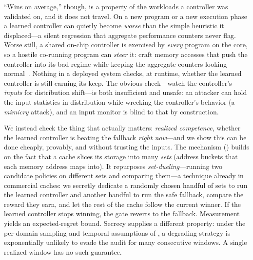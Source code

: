 \documentclass{article}
\begin{document}
``Wins on average,'' though, is a property of the workloads a controller was
validated on, and it does not travel. On a new program or a new execution phase a
learned controller can quietly become \emph{worse} than the simple heuristic it
displaced---a silent regression that aggregate performance counters never flag.
Worse still, a shared on-chip controller is exercised by \emph{every} program on
the core, so a hostile co-running program can \emph{steer} it: craft memory
accesses that push the controller into its bad regime while keeping the aggregate
counters looking normal~\citep{guo2022adversarialprefetch,evtyushkin2018branchscope}.
Nothing in a deployed system checks, at runtime, whether the learned controller is
still earning its keep. The obvious check---watch the controller's \emph{inputs}
for distribution shift---is both insufficient and unsafe: an attacker can hold the
input statistics in-distribution while wrecking the controller's behavior (a
\emph{mimicry} attack), and an input monitor is blind to that by construction.

We instead check the thing that actually matters: \emph{realized competence}, whether
the learned controller is beating the fallback \emph{right now}---and we show this can
be done cheaply, provably, and without trusting the inputs. The mechanism
() builds on the fact that a cache slices its storage into many
\emph{sets} (address buckets that each memory address maps into). It repurposes
\emph{set-dueling}---running two candidate policies on different sets and comparing
them---a technique already in commercial caches: we secretly dedicate a randomly
chosen handful of sets to run the learned controller and another handful to run the
safe fallback, compare the reward they earn, and let the rest of the cache follow
the current winner. If the learned controller stops winning, the gate reverts to
the fallback. Measurement yields an expected-regret bound. Secrecy supplies a
different property: under the per-domain sampling and temporal assumptions of
, a degrading strategy is exponentially unlikely to evade the
audit for many consecutive windows. A single realized window has no such
guarantee.
\end{document}
